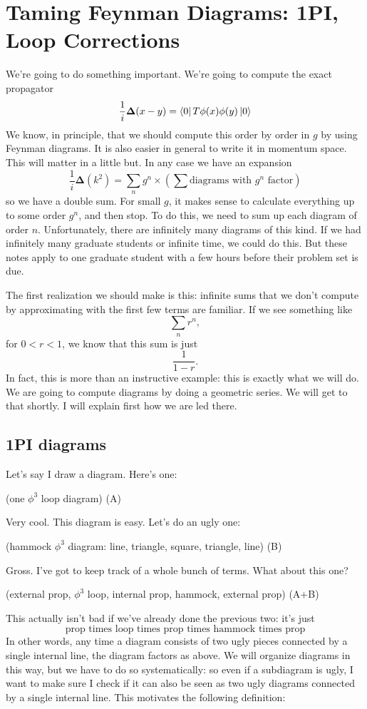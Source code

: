 \documentclass{book}
\begin{document}
\chapter{Taming Feynman Diagrams: 1PI, Loop Corrections}
We're going to do something important. We're going to compute the exact propagator 
\[
\frac{1}{i}\mathbf{\Delta}(x-y) = \bra{0} T \phi(x) \phi(y) \ket{0}
\]
We know, in principle, that we should compute this order by order in $g$ by using Feynman diagrams. It is also easier in general to write it in momentum space. This will matter in a little but. In any case we have an expansion
\[
\frac{1}{i}\mathbf{\Delta}(k^2) = \sum_n g^n \times \left( \sum \text{diagrams with $g^n$ factor} \right)
\]
so we have a double sum. For small $g$, it makes sense to calculate everything up to some order $g^n$, and then stop. To do this, we need to sum up each diagram of order $n$. Unfortunately, there are infinitely many diagrams of this kind. If we had infinitely many graduate students or infinite time, we could do this. But these notes apply to one graduate student with a few hours before their problem set is due.

The first realization we should make is this: infinite sums that we don't compute by approximating with the first few terms are familiar. If we see something like
\[
\sum_n r^n,
\]
for $0 < r < 1$, we know that this sum is just
\[
\frac{1}{1-r}.
\]
In fact, this is more than an instructive example: this is exactly what we will do. We are going to compute diagrams by doing a geometric series. We will get to that shortly. I will explain first how we are led there. \newpage

\section{1PI diagrams}
Let's say I draw a diagram. Here's one:

(one $\phi^3$ loop diagram) (A)

Very cool. This diagram is easy. Let's do an ugly one:

(hammock $\phi^3$ diagram: line, triangle, square, triangle, line) (B)

Gross. I've got to keep track of a whole bunch of terms. What about this one?

(external prop, $\phi^3$ loop, internal prop, hammock, external prop) (A+B)

This actually isn't bad if we've already done the previous two: it's just
\[
\text{prop times loop times prop times hammock times prop}
\]
In other words, any time a diagram consists of two ugly pieces connected by a single internal line, the diagram factors as above. We will organize diagrams in this way, but we have to do so systematically: so even if a subdiagram is ugly, I want to make sure I check if it can also be seen as two ugly diagrams connected by a single internal line. This motivates the following definition:
\end{document}
